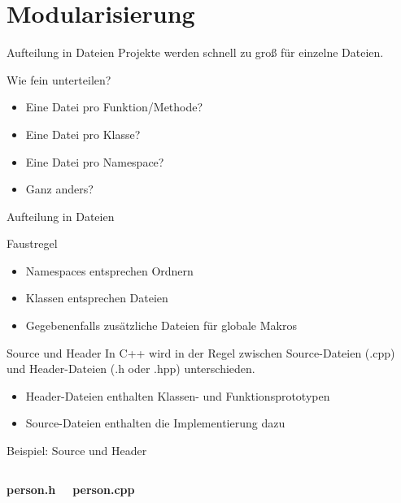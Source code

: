 \section{Modularisierung}

\begin{frame}[fragile]{Aufteilung in Dateien}
	Projekte werden schnell zu groß für einzelne Dateien.
	
	\begin{block}{Wie fein unterteilen?}
		\begin{itemize}
			\item Eine Datei pro Funktion/Methode?
			\item Eine Datei pro Klasse?
			\item Eine Datei pro Namespace?
			\item Ganz anders?
		\end{itemize}
	\end{block}
\end{frame}

\begin{frame}[fragile]{Aufteilung in Dateien}
	\begin{block}{Faustregel}
		\begin{itemize}
			\item Namespaces entsprechen Ordnern
			\item Klassen entsprechen Dateien
			\item Gegebenenfalls zusätzliche Dateien für globale Makros
		\end{itemize}
	\end{block}
\end{frame}

\begin{frame}[fragile]{Source und Header}
	In C++ wird in der Regel zwischen Source-Dateien (.cpp) und Header-Dateien (.h oder .hpp) unterschieden.
	
	\begin{itemize}
		\item Header-Dateien enthalten Klassen- und Funktionsprototypen
		\item Source-Dateien enthalten die Implementierung dazu
	\end{itemize}
\end{frame}

\begin{frame}[fragile]{Beispiel: Source und Header}
	\footnotesize
	
	
	\begin{columns}
		\textbf{person.h}
		
		
		\textbf{person.cpp}
		
	\end{columns}
\end{frame}


